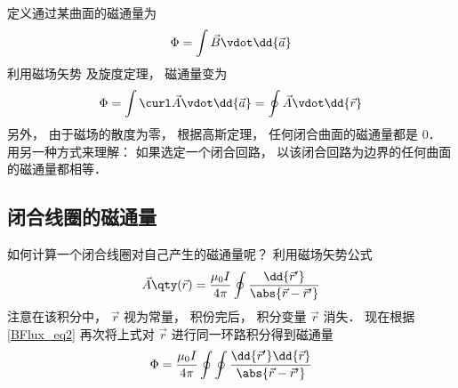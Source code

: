 
定义通过某曲面的磁通量为
\begin{equation}
\Phi  = \int \vec B \vdot \dd{\vec a}
\end{equation}
利用磁场矢势%
及旋度定理， %
磁通量变为
\begin{equation} \label{BFlux_eq2}
\Phi  = \int \curl \vec A \vdot \dd{\vec a}  = \oint \vec A \vdot \dd{\vec r}
\end{equation}
另外， 由于磁场的散度为零， 根据高斯定理， 任何闭合曲面的磁通量都是 0． 用另一种方式来理解： 如果选定一个闭合回路， 以该闭合回路为边界的任何曲面的磁通量都相等．

\subsection{闭合线圈的磁通量}

如何计算一个闭合线圈对自己产生的磁通量呢？ 利用磁场矢势公式
\begin{equation}
\vec A \qty(\vec r) = \frac{\mu_0 I}{4 \pi} \oint \frac{\dd{\vec r'}}{\abs{\vec r - \vec r'}}
\end{equation}
注意在该积分中， $\vec r$ 视为常量， 积份完后， 积分变量 $\vec r$ 消失． 现在根据\autoref{BFlux_eq2} 再次将上式对 $\vec r$ 进行同一环路积分得到磁通量
\begin{equation}
\Phi  = \frac{\mu_0 I}{4\pi} \oint\oint \frac{\dd{\vec r'} \dd{\vec r}}{\abs{\vec r - \vec r'}}
\end{equation}
